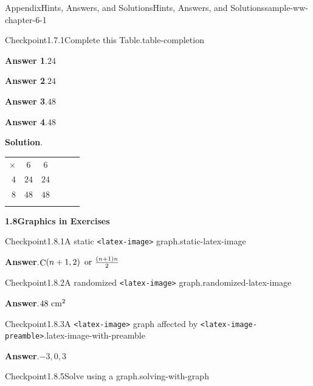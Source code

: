 \documentclass[oneside,10pt,]{book}
\newcommand{\blocktitlefont}{\relax}
\newcommand{\tabularfont}{\relax}
\newcommand{\mono}[1]{\texttt{#1}}
\numberwithin{equation}{section}
\newcommand{\hrulethin}  {\noalign{\hrule height 0.04em}}
\newcommand{\hrulethick} {\noalign{\hrule height 0.11em}}
\begin{document}
\begin{solutions-chapter}{Appendix}{Hints, Answers, and Solutions}{}{Hints, Answers, and Solutions}{}{}{sample-ww-chapter-6-1}
\begin{inlinesolution}{Checkpoint}{1.7.1}{Complete this Table.}{table-completion}
\par\smallskip%
\noindent\textbf{\blocktitlefont Answer 1}.\hypertarget{table-completion-3-back}{}\quad{}\(24\)%
\par\smallskip%
\noindent\textbf{\blocktitlefont Answer 2}.\hypertarget{table-completion-4-back}{}\quad{}\(24\)%
\par\smallskip%
\noindent\textbf{\blocktitlefont Answer 3}.\hypertarget{table-completion-5-back}{}\quad{}\(48\)%
\par\smallskip%
\noindent\textbf{\blocktitlefont Answer 4}.\hypertarget{table-completion-6-back}{}\quad{}\(48\)%
\par\smallskip%
\noindent\textbf{\blocktitlefont Solution}.\hypertarget{table-completion-7-back}{}\quad{}\begin{center}%
{\tabularfont%
\begin{tabular}{rCcAcA}
\(\times\)&\(6\)&\(6\)\tabularnewline\hrulethick
\(4\)&\(24\)&\(24\)\tabularnewline\hrulethin
\(8\)&\(48\)&\(48\)\tabularnewline\hrulethin
\end{tabular}
}%
\end{center}%
\end{inlinesolution}%
\par\medskip
\noindent\textbf{\Large{}1.8\space\textperiodcentered\space{}Graphics in Exercises}
\begin{inlinesolution}{Checkpoint}{1.8.1}{A static \mono{<latex-image>} graph.}{static-latex-image}%
\par\smallskip%
\noindent\textbf{\blocktitlefont Answer}.\hypertarget{static-latex-image-3-back}{}\quad{}\(\mathop{\rm C}\nolimits\!\left(n+1,2\right)\hbox{ or }\frac{\left(n+1\right)n}{2}\)%
\end{inlinesolution}%
\begin{inlinesolution}{Checkpoint}{1.8.2}{A randomized \mono{<latex-image>} graph.}{randomized-latex-image}%
\par\smallskip%
\noindent\textbf{\blocktitlefont Answer}.\hypertarget{randomized-latex-image-3-back}{}\quad{}\(48\ {\rm cm^{2}}\)%
\end{inlinesolution}%
\begin{inlinesolution}{Checkpoint}{1.8.3}{A \mono{<latex-image>} graph affected by \mono{<latex-image-preamble>}.}{latex-image-with-preamble}%
\par\smallskip%
\noindent\textbf{\blocktitlefont Answer}.\hypertarget{latex-image-with-preamble-3-back}{}\quad{}\(-3, 0, 3\)%
\end{inlinesolution}%
\begin{inlinesolution}{Checkpoint}{1.8.5}{Solve using a graph.}{solving-with-graph}%

\end{inlinesolution}
\end{solutions-chapter}
\end{document}
